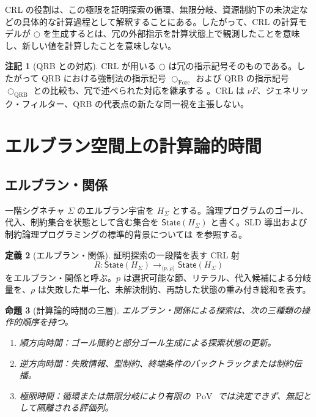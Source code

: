 \documentclass[a4paper,11pt]{ltjsarticle}
\theoremstyle{definition}
\newtheorem{definition}{定義}[section]
\newtheorem{remark}[definition]{注記}
\theoremstyle{plain}
\newtheorem{proposition}[definition]{命題}
\newcommand{\PoV}{\operatorname{PoV}}
\newcommand{\dfix}{\bigcirc}
\newcommand{\QRB}{\mathrm{QRB}}
\newcommand{\Forc}{\mathrm{Forc}}
\begin{document}
CRL の役割は、この極限を証明探索の循環、無限分岐、資源制約下の未決定などの具体的な計算過程として解釈することにある。したがって、CRL の計算モデルが $\dfix$ を生成するとは、冗の外部指示を計算状態上で観測したことを意味し、新しい値を計算したことを意味しない。

\begin{remark}[QRB との対応]
CRL が用いる $\dfix$ は冗の指示記号そのものである。したがって QRB における強制法の指示記号 $\dfix_{\Forc}$ および QRB の指示記号 $\dfix_{\QRB}$ との比較も、冗で述べられた対応を継承する \cite{ChibaAmphigory2026,ChibaQRB2026}。CRL は $\nu F$、ジェネリック・フィルター、QRB の代表点の新たな同一視を主張しない。
\end{remark}

\section{エルブラン空間上の計算論的時間}

\subsection{エルブラン・関係}

一階シグネチャ $\Sigma$ のエルブラン宇宙を $H_\Sigma$ とする。論理プログラムのゴール、代入、制約集合を状態として含む集合を $\mathsf{State}(H_\Sigma)$ と書く。SLD 導出および制約論理プログラミングの標準的背景については \cite{Lloyd1987,JaffarLassez1987} を参照する。

\begin{definition}[エルブラン・関係]
証明探索の一段階を表す CRL 射
\[
 R:\mathsf{State}(H_\Sigma)
 \longrightarrow_{\langle p,\rho\rangle}
 \mathsf{State}(H_\Sigma)
\]
をエルブラン・関係と呼ぶ。$p$ は選択可能な節、リテラル、代入候補による分岐量を、$\rho$ は失敗した単一化、未解決制約、再訪した状態の重み付き総和を表す。
\end{definition}

\begin{proposition}[計算論的時間の三層]
エルブラン・関係による探索は、次の三種類の操作的順序を持つ。
\begin{enumerate}
 \item 順方向時間：ゴール簡約と部分ゴール生成による探索状態の更新。
 \item 逆方向時間：失敗情報、型制約、終端条件のバックトラックまたは制約伝播。
 \item 極限時間：循環または無限分岐により有限の $\PoV$ では決定できず、無記として隔離される評価列。
\end{enumerate}
\end{proposition}
\end{document}
